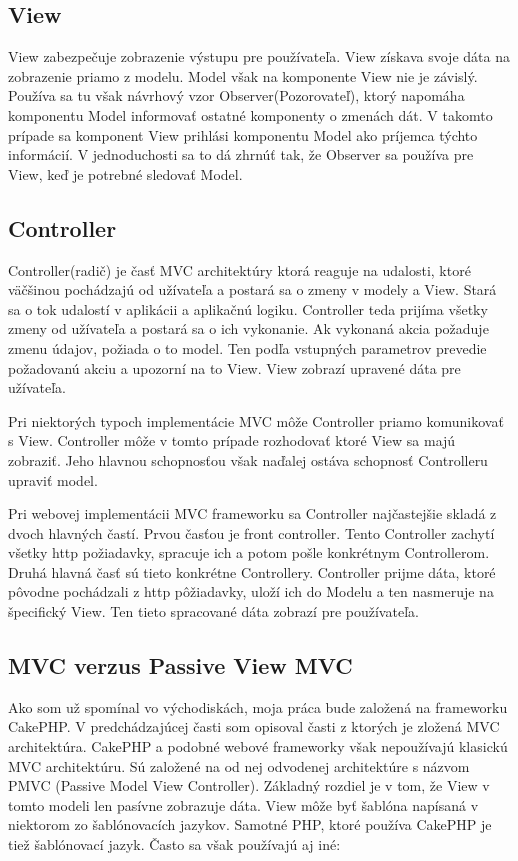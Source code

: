 \documentclass[12pt,oneside]{book}
\begin{document}
\subsection{View}
View zabezpečuje zobrazenie výstupu pre používateľa. View získava svoje dáta na zobrazenie priamo z modelu. Model však na komponente View nie je závislý. Používa sa tu však návrhový vzor Observer(Pozorovateľ), ktorý napomáha komponentu Model  informovať ostatné komponenty o zmenách dát. V takomto prípade sa komponent View prihlási komponentu Model ako príjemca týchto informácií. V jednoduchosti sa to dá zhrnúť tak, že Observer sa používa pre View, keď je potrebné sledovať Model.



\subsection{Controller}
Controller(radič) je časť MVC architektúry ktorá reaguje na udalosti, ktoré väčšinou pochádzajú od užívateľa a postará sa o zmeny v modely a View.  Stará sa o tok udalostí v aplikácii a aplikačnú logiku. Controller teda prijíma všetky zmeny od užívateľa a postará sa o ich vykonanie. Ak vykonaná akcia požaduje zmenu údajov, požiada o to model. Ten podľa vstupných parametrov prevedie požadovanú akciu a upozorní na to View. View zobrazí upravené dáta pre užívateľa.

Pri niektorých typoch implementácie MVC môže Controller priamo komunikovať s View. Controller môže v tomto prípade rozhodovať ktoré View sa majú zobraziť. Jeho hlavnou schopnosťou však naďalej ostáva schopnosť Controlleru upraviť model.

Pri webovej implementácii MVC frameworku sa Controller najčastejšie skladá z dvoch hlavných častí. Prvou časťou je front controller. Tento Controller zachytí všetky http požiadavky, spracuje ich a potom pošle konkrétnym Controllerom. Druhá hlavná časť sú tieto konkrétne Controllery. Controller prijme dáta, ktoré pôvodne pochádzali z http pôžiadavky, uloží ich do Modelu a ten nasmeruje na špecifický View. Ten tieto spracované dáta zobrazí pre používateľa.

\subsection{MVC verzus Passive View MVC}
Ako som už spomínal vo východiskách, moja práca bude založená na frameworku CakePHP. V predchádzajúcej časti som opisoval časti z ktorých je zložená MVC architektúra. CakePHP a podobné webové frameworky však nepoužívajú klasickú MVC architektúru. Sú založené na od nej odvodenej architektúre s názvom PMVC (Passive Model View Controller). Základný rozdiel je v tom, že View v tomto modeli len pasívne zobrazuje dáta. View môže byť šablóna napísaná v niektorom zo šablónovacích jazykov. Samotné PHP, ktoré používa CakePHP je tiež šablónovací jazyk. Často sa však používajú aj iné: 
\end{document}
